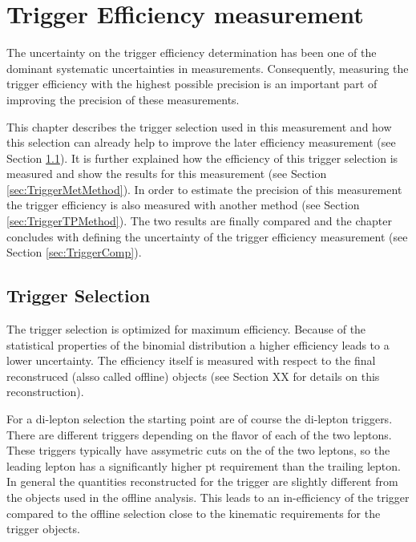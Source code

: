 
\chapter{Trigger Efficiency measurement}  %

The uncertainty on the trigger efficiency determination has been one of the dominant systematic uncertainties in \sttbar measurements.
Consequently, measuring the trigger efficiency with the highest possible precision is an important part of improving the precision of these
measurements.

This chapter describes the trigger selection used in this measurement and how this selection can already help to improve
the later efficiency measurement (see Section \ref{sec:TriggerSel}). It is further explained how the efficiency of this trigger selection is measured and
show the results for this measurement (see Section \ref{sec:TriggerMetMethod}). In order to estimate the precision of this measurement the trigger efficiency
is also measured with another method (see Section \ref{sec:TriggerTPMethod}). The two results are finally compared and the chapter concludes with defining the uncertainty
of the trigger efficiency measurement (see Section \ref{sec:TriggerComp}). 



\section{Trigger Selection} %
\label{sec:TriggerSel}

The trigger selection is optimized for maximum efficiency. Because of the statistical properties of the binomial distribution a higher efficiency
leads to a lower uncertainty. The efficiency itself is measured with respect to the final reconstruced (alsso called offline) objects (see Section XX for details
on this reconstruction).

For a di-lepton selection the starting point are of course the di-lepton triggers. There are different triggers depending on the flavor of each of the
two leptons. These triggers typically have assymetric cuts on the \pt of the two leptons, so the leading lepton has a significantly higher pt requirement than
the trailing lepton. In general the quantities reconstructed for the trigger are slightly different from the objects used in the offline analysis. This
leads to an in-efficiency of the trigger compared to the offline selection close to the kinematic requirements for the trigger objects.


